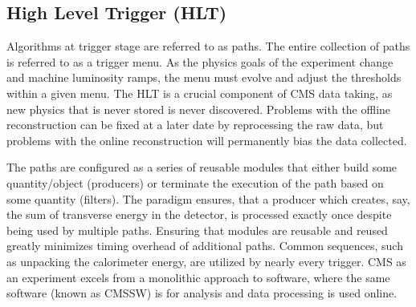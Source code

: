 \subsection{High Level Trigger (HLT)}



Algorithms at trigger stage are referred to as paths. The entire collection of paths is referred to
 as a trigger menu. As the physics goals of the experiment change and machine luminosity ramps, 
the menu must evolve and adjust the thresholds within a given menu. The HLT is a crucial component of 
CMS data taking, as new physics that is never stored is never discovered. Problems with the offline
 reconstruction can be fixed at a later date by reprocessing the raw data, but problems with the online reconstruction 
will permanently bias the data collected. 

The paths are configured as a series of reusable modules that either build some quantity/object (producers) 
or terminate the execution of the path based on some quantity (filters). The paradigm ensures, that a producer which creates, say, the sum of transverse energy in the detector, is processed exactly once despite being used by multiple paths. Ensuring that modules are reusable and reused greatly minimizes timing overhead of additional
paths. Common sequences, such as unpacking the calorimeter energy, are utilized by nearly every trigger. 
CMS as an experiment excels from a monolithic approach to software, where the same software (known as CMSSW) is
 for analysis and data processing is used online.

